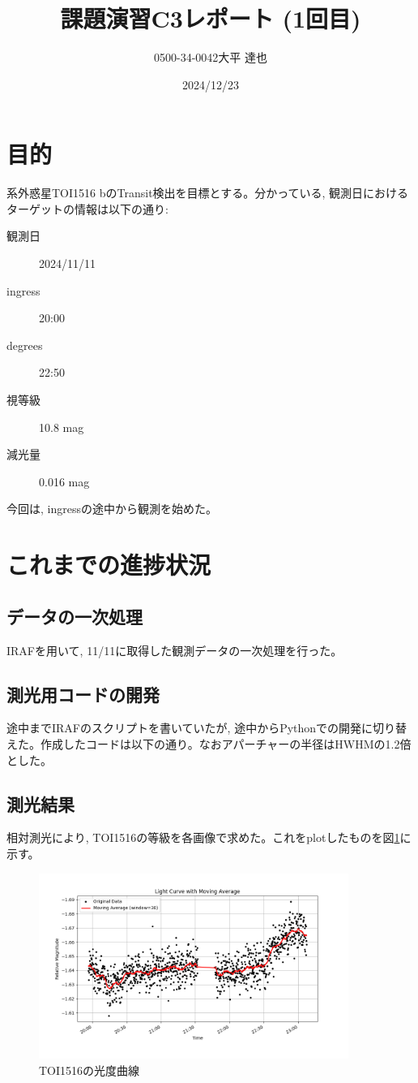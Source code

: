 \documentclass[dvipdfmx,a4paper]{jsarticle}
\begin{document}
\title{課題演習C3\quad レポート (1回目) }
\author{0500-34-0042\quad 大平 達也}
\date{2024/12/23}
\maketitle

\section{目的}
系外惑星TOI1516 bのTransit検出を目標とする。分かっている, 観測日におけるターゲットの情報は以下の通り: 
\begin{description}
  \item[観測日] 2024/11/11
  \item[ingress] 20:00
  \item[degrees] 22:50
  \item[視等級] 10.8 mag
  \item[減光量] 0.016 mag
\end{description}
今回は, ingressの途中から観測を始めた。
\section{これまでの進捗状況}
\subsection{データの一次処理}
IRAFを用いて, 11/11に取得した観測データの一次処理を行った。
\subsection{測光用コードの開発}
途中までIRAFのスクリプトを書いていたが, 途中からPythonでの開発に切り替えた。作成したコードは以下の通り。なおアパーチャーの半径はHWHMの1.2倍とした。 



\subsection{測光結果}
相対測光により, TOI1516の等級を各画像で求めた。これをplotしたものを図\ref{fig:toi1516}に示す。

\begin{figure}[H]
  \centering
  \includegraphics[width=0.9\textwidth]{./fig/light_curve_toi1516_with_moving_average.png}
  \caption{TOI1516の光度曲線}
  \label{fig:toi1516}
\end{figure}
\end{document}
